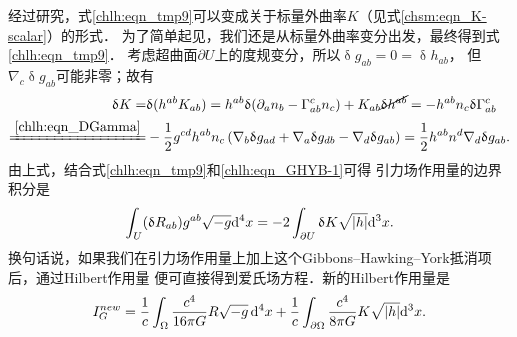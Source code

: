 经过研究，式\eqref{chlh:eqn_tmp9}可以变成关于标量外曲率$K$（见式\eqref{chsm:eqn_K-scalar}）的形式．
为了简单起见，我们还是从标量外曲率变分出发，最终得到式\eqref{chlh:eqn_tmp9}．
考虑超曲面$\partial U$上的度规变分，所以$\updelta g_{ab}=0=\updelta h_{ab}$，
但$\nabla_c\updelta g_{ab}$可能非零；故有
\begin{equation}
\begin{aligned}
    \updelta K =& \updelta (h^{ab} K_{ab})
    =h^{ab} \updelta (\partial_a n_b - \Gamma^c_{ab} n_c)
      + K_{ab} \cancel{\updelta h^{ab}}
    =-h^{ab} n_c \updelta \Gamma^c_{ab} \\
    \xlongequal{\ref{chlh:eqn_DGamma}}&
    -\frac{1}{2} g^{cd} h^{ab} n_c\left(  \nabla_b \updelta g_{ad}
    + \nabla_a \updelta g_{db} - \nabla_d \updelta g_{ab} \right)
    = \frac{1}{2} h^{ab} n^d \nabla_d \updelta g_{ab} .
\end{aligned}
\end{equation}
由上式，结合式\eqref{chlh:eqn_tmp9}和\eqref{chlh:eqn_GHYB-1}可得
引力场作用量的边界积分是
\begin{equation}\label{chlh:eqn_GHYB}
   \int_U (\updelta R_{ab}) g^{ab} \sqrt{-g} {\rm d}^{4}x
        =  -2\int_{\partial U} \updelta K   \sqrt{|h|} {\rm d}^{3}x .
\end{equation}
换句话说，如果我们在引力场作用量上加上这个Gibbons--Hawking--York抵消项后，通过Hilbert作用量
便可直接得到爱氏场方程．新的Hilbert作用量是
\begin{equation}\label{chlh:eqn_I-G-new}
    I_G^{new} =  \frac{1}{c} \int_\Omega \frac{c^4}{16\pi G} R\sqrt{-g}\,{\rm d}^{4}x
     +\frac{1}{c} \int_{\partial \Omega} \frac{c^4}{8\pi G} K   \sqrt{|h|} {\rm d}^{3}x  .
\end{equation}


%

   


